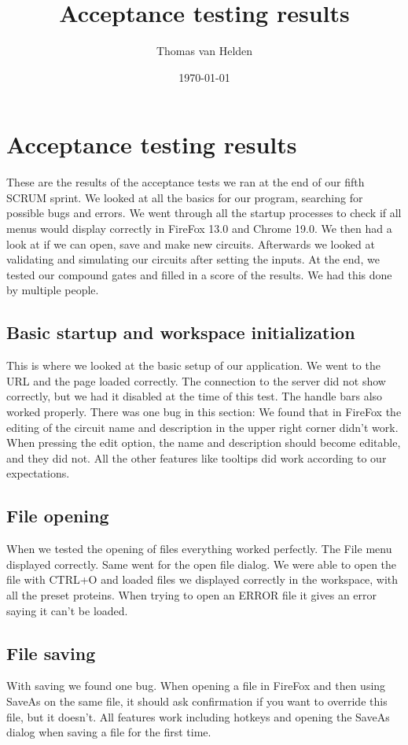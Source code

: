 \documentclass[a4paper]{article}
\begin{document}
\title{Acceptance testing results}
\author{Thomas van Helden}
\date{\today}
\maketitle



\section{Acceptance testing results}
These are the results of the acceptance tests we ran at the end of our fifth SCRUM sprint. We looked at all the basics for our program, searching for possible bugs and errors. We went through all the startup processes to check if all menus would display correctly in FireFox 13.0 and Chrome 19.0. We then had a look at if we can open, save and make new circuits. Afterwards we looked at validating and simulating our circuits after setting the inputs. At the end, we tested our compound gates and filled in a score of the results. We had this done by multiple people.

\subsection{Basic startup and workspace initialization}
This is where we looked at the basic setup  of our application. We went to the URL and the page loaded correctly. The connection to the server did not show correctly, but we had it disabled at the time of this test. The handle bars also worked properly. There was one bug in this section: We found that in FireFox the editing of the circuit name and description in the upper right corner didn't work. When pressing the edit option, the name and description should become editable, and they did not.
All the other features like tooltips did work according to our expectations.

\subsection{File opening}
When we tested the opening of files everything worked perfectly. The File menu displayed correctly. Same went for the open file dialog. We were able to open the file with CTRL+O and loaded files we displayed correctly in the workspace, with all the preset proteins.
When trying to open an ERROR file it gives an error saying it can't be loaded.

\subsection{File saving}
With saving we found one bug. When opening a file in FireFox and then using SaveAs on the same file, it should ask confirmation if you want to override this file, but it doesn't. All features work including hotkeys and opening the SaveAs dialog when saving a file for the first time.
\end{document}
